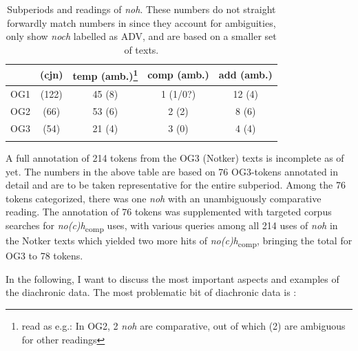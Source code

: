 \documentclass[output=paper,
modfonts
]{langscibook}
\begin{document}
\begin{table}[p]
\begin{tabular}{lcccc}
\lsptoprule
	& (cjn) & temp (amb.)\footnote{read as e.g.: In OG2, 2 \textit{noh} are comparative, out of which (2) are ambiguous for other readings}& comp (amb.)	& add (amb.)	\\
\midrule
OG1		& (122) & 45 (8)    & 1 (1/0?)  & 12 (4)    \\ 
OG2		& (66)  & 53 (6)    & 2 (2)     & 8 (6)     \\
OG3		& (54)  & 21 (4)    & 3 (0)     & 4 (4)     \\
\lspbottomrule
\end{tabular}
\caption{Subperiods and readings of \textit{noh}. These numbers do not straight forwardly match numbers in  since they account for ambiguities, only show \textit{noch} labelled as ADV, and are based on a smaller set of texts.}
\label{tab:subperiods_and_readings}
\end{table}

\noindent A full annotation of 214 tokens from the OG3 (Notker) texts is incomplete as of yet. The numbers in the above table are based on 76 OG3-tokens annotated in detail and are to be taken representative for the entire subperiod. Among the 76 tokens categorized, there was one \textit{noh} with an unambiguously comparative reading. The annotation of 76 tokens was supplemented with targeted corpus searches for \textit{no(c)h}\textsubscript{comp} uses, with various queries among all 214 uses of \textit{noh} in the Notker texts which yielded two more hits of \textit{no(c)h}\textsubscript{comp}, bringing the total for OG3 to 78 tokens.

In the following, I want to discuss the most important aspects and examples of the diachronic data. The most problematic bit of diachronic data is :
\end{document}
